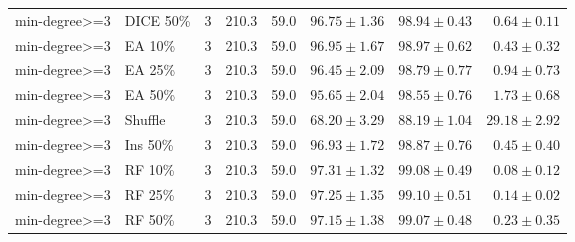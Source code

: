 {\begin{longtable}{llrrrrrr}
min-degree>=3 & DICE 50\% & 3 & 210.3 & 59.0 & $96.75\pm1.36$ & $98.94\pm0.43$ & $0.64\pm0.11$ \\
min-degree>=3 & EA 10\% & 3 & 210.3 & 59.0 & $96.95\pm1.67$ & $98.97\pm0.62$ & $0.43\pm0.32$ \\
min-degree>=3 & EA 25\% & 3 & 210.3 & 59.0 & $96.45\pm2.09$ & $98.79\pm0.77$ & $0.94\pm0.73$ \\
min-degree>=3 & EA 50\% & 3 & 210.3 & 59.0 & $95.65\pm2.04$ & $98.55\pm0.76$ & $1.73\pm0.68$ \\
min-degree>=3 & Shuffle & 3 & 210.3 & 59.0 & $68.20\pm3.29$ & $88.19\pm1.04$ & $29.18\pm2.92$ \\
min-degree>=3 & Ins 50\% & 3 & 210.3 & 59.0 & $96.93\pm1.72$ & $98.87\pm0.76$ & $0.45\pm0.40$ \\
min-degree>=3 & RF 10\% & 3 & 210.3 & 59.0 & $97.31\pm1.32$ & $99.08\pm0.49$ & $0.08\pm0.12$ \\
min-degree>=3 & RF 25\% & 3 & 210.3 & 59.0 & $97.25\pm1.35$ & $99.10\pm0.51$ & $0.14\pm0.02$ \\
min-degree>=3 & RF 50\% & 3 & 210.3 & 59.0 & $97.15\pm1.38$ & $99.07\pm0.48$ & $0.23\pm0.35$ \\
\end{longtable}
}

